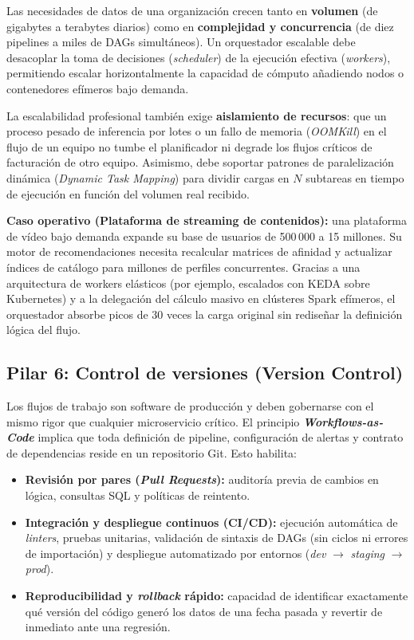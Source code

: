 Las necesidades de datos de una organización crecen tanto en \textbf{volumen} (de gigabytes a terabytes diarios) como en \textbf{complejidad y concurrencia} (de diez pipelines a miles de DAGs simultáneos). Un orquestador escalable debe desacoplar la toma de decisiones (\textit{scheduler}) de la ejecución efectiva (\textit{workers}), permitiendo escalar horizontalmente la capacidad de cómputo añadiendo nodos o contenedores efímeros bajo demanda.

La escalabilidad profesional también exige \textbf{aislamiento de recursos}: que un proceso pesado de inferencia por lotes o un fallo de memoria (\textit{OOMKill}) en el flujo de un equipo no tumbe el planificador ni degrade los flujos críticos de facturación de otro equipo. Asimismo, debe soportar patrones de paralelización dinámica (\textit{Dynamic Task Mapping}) para dividir cargas en $N$ subtareas en tiempo de ejecución en función del volumen real recibido.

\textbf{Caso operativo (Plataforma de streaming de contenidos):} una plataforma de vídeo bajo demanda expande su base de usuarios de 500\,000 a 15 millones. Su motor de recomendaciones necesita recalcular matrices de afinidad y actualizar índices de catálogo para millones de perfiles concurrentes. Gracias a una arquitectura de workers elásticos (por ejemplo, escalados con KEDA sobre Kubernetes) y a la delegación del cálculo masivo en clústeres Spark efímeros, el orquestador absorbe picos de 30 veces la carga original sin rediseñar la definición lógica del flujo.

\subsection{Pilar 6: Control de versiones (Version Control)}\label{subsec:pilar-versionado}

Los flujos de trabajo son software de producción y deben gobernarse con el mismo rigor que cualquier microservicio crítico. El principio \textbf{\textit{Workflows-as-Code}} implica que toda definición de pipeline, configuración de alertas y contrato de dependencias reside en un repositorio Git. Esto habilita:
\begin{itemize}
  \item \textbf{Revisión por pares (\textit{Pull Requests}):} auditoría previa de cambios en lógica, consultas SQL y políticas de reintento.
  \item \textbf{Integración y despliegue continuos (CI/CD):} ejecución automática de \textit{linters}, pruebas unitarias, validación de sintaxis de DAGs (sin ciclos ni errores de importación) y despliegue automatizado por entornos (\textit{dev} $\to$ \textit{staging} $\to$ \textit{prod}).
  \item \textbf{Reproducibilidad y \textit{rollback} rápido:} capacidad de identificar exactamente qué versión del código generó los datos de una fecha pasada y revertir de inmediato ante una regresión.
\end{itemize}

